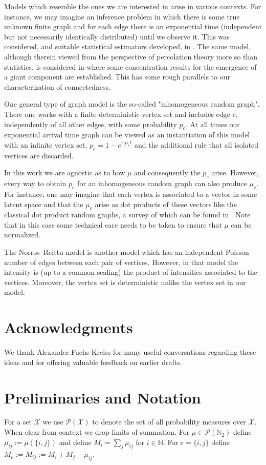 \documentclass[12pt]{article}
\theoremstyle{definition}
\begin{document}
Models which resemble the ones we are interested in arise in various contexts. For instance, we may imagine an inference problem in which there is some true unknown finite graph and for each edge there is an exponential time (independent but not necessarily identically distributed) until we observe it. This was considered, and suitable statistical estimators developed, in \cite{aldous_2021_a}. The same model, although therein viewed from the perspective of percolation theory more so than statistics, is considered in \cite{aldous_2016_weak,aldous_2019_the} where some concentration results for the emergence of a giant component are established. This has some rough parallels to our characterization of connectedness.

One general type of graph model is the so-called "inhomogeneous random graph". There one works with a finite deterministic vertex set and includes edge $e$, independently of all other edges, with some probability $p_e$. At all times our exponential arrival time graph can be viewed as an instantiation of this model with an infinite vertex set, $p_e = 1-e^{-\mu_e t}$ and the additional rule that all isolated vertices are discarded.  

In this work we are agnostic as to how $\mu$ and consequently the $p_e$ arise. However, every way to obtain $p_e$ for an inhomogeneous random graph can also produce $\mu_e$. For instance, one may imagine that each vertex is associated to a vector in some latent space and that the $\mu_e$ arise as dot products of these vectors like the classical dot product random graphs, a survey of which can be found in \cite{athreya_2017_statistical}. Note that in this case some technical care needs to be taken to ensure that $\mu$ can be normalized.

The Norros–Reittu model \cite{norros_2006_on} is another model which has an independent Poisson number of edges between each pair of vertices. However, in that model the intensity is (up to a common scaling) the product of intensities associated to the vertices. Moreover, the vertex set is deterministic unlike the vertex set in our model. 

\section*{Acknowledgments}
We thank Alexander Fuchs-Kreiss for many useful conversations regarding these ideas and for offering valuable feedback on earlier drafts.


\section{Preliminaries and Notation} \label{Preliminaries and Notation}
For a set $\mathcal{X}$ we use $\mathcal{P}(\mathcal{X})$ to denote the set of all probability measures over $\mathcal{X}$. When clear from context we drop limits of summation. For $\mu \in \mathcal{P}(\mathbb{N}_2)$ define $\mu_{ij}:=\mu(\{i,j\})$ and define $M_i = \sum_{j}\mu_{ij}$ for $i \in \mathbb{N}$. For $e=\{i,j\}$ define $M_e := M_{ij} := M_i+M_j-\mu_{ij}$.
\end{document}
